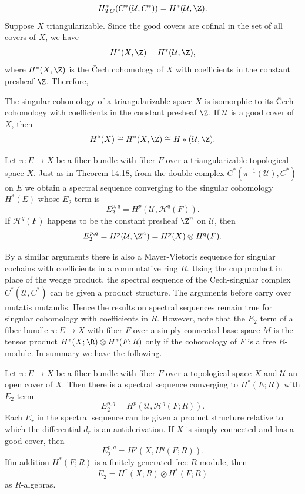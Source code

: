 \[H^*_{TC}(C^*(\mathcal{U},C^*))=H^*(\mathcal{U},\Z).\]
Suppose $X$ triangularizable. Since the good covers are cofinal in the set of all covers of $X$, we have
\[H^*(X,\Z)=H^*(\mathcal{U},\Z),\]
where $H^*(X,\Z)$ is the \v{C}ech cohomology of $X$ with coefficients in the constant presheaf $\Z$. Therefore,
\begin{theorem}
The singular cohomology of a triangularizable space $X$ is isomorphic to its \v{C}ech cohomology with coefficients in the constant presheaf $\Z$. If $\mathcal{U}$ is a 
good cover of $X$, then
\[H^*(X)\cong H^*(X,\Z)\cong H*(\mathcal{U},\Z).\]
\end{theorem}
Let $\pi:E\to X$ be a fiber bundle with fiber $F$ over a triangularizable topological space $X$. Just as in Theorem 14.18, from the double complex $C^*(\pi^{-1}(\mathcal{U}),C^*)$ 
on $E$ we obtain a spectral sequence converging to the singular cohomology $H^*(E)$ whose $E_2$ term is
\[E_2^{p,q}=H^p(\mathcal{U},\mathscr{H}^q(F)).\]
If $\mathscr{H}^q(F)$ happens to be the constant presheaf $\Z^n$ on $\mathcal{U}$, then
\[E_2^{p,q}=H^p(\mathcal{U},\Z^n)=H^p(X)\otimes H^q(F).\]

By a similar arguments there is also a Mayer-Vietoris sequence for singular cochains with coefficients in a commutative ring $R$. Using the cup product in place of the 
wedge product, the spectral sequence of the Cech-singular complex $C^*(\mathcal{U},C^*)$ can be given a product structure. The arguments before carry over mutatis 
mutandis. Hence the results on spectral sequences remain true for singular cohomology with coefficients in $R$. However, note that the $E_2$ term of a fiber bundle 
$\pi:E\to X$ with fiber $F$ over a simply connected base space $M$ is the tensor product $H^*(X;\R)\otimes H^*(F;R)$ only if the cohomology of $F$ is a free $R$-module. 
In summary we have the following.
\begin{theorem}
Let $\pi:E\to X$ be a fiber bundle with fiber $F$ over a topological space $X$ and $\mathcal{U}$ an open cover of $X$. Then there is a spectral sequence converging to 
$H^*(E;R)$ with $E_2$ term
\[E_2^{p,q}=H^p(\mathcal{U},\mathscr{H}^q(F;R)).\]
Each $E_r$ in the spectral sequence can be given a product structure relative to which the differential $d_r$ is an antiderivation. If $X$ is simply connected and has
a good cover, then
\[E_2^{p,q}=H^p(X,H^q(F;R)).\]
Ifin addition $H^*(F;R)$ is a finitely generated free $R$-module, then
\[E_2=H^*(X;R)\otimes H^*(F;R)\]
as $R$-algebras.
\end{theorem}

